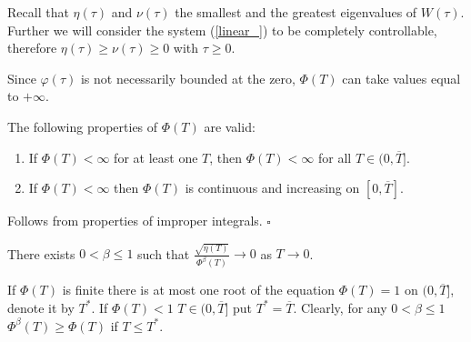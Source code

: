 \documentclass[../main.tex]{subfiles}
\begin{document}
 Recall that $\eta(\tau)$ and $\nu(\tau)$ the smallest and the greatest eigenvalues of $W(\tau)$. Further we will consider the system (\ref{linear_}) to be completely controllable, therefore $\eta(\tau) \geqslant \nu(\tau) \geqslant 0$  with $\tau \geq 0$.
 
Since $ \varphi(\tau) $ is not necessarily bounded at the zero, $\Phi(T)$ can take values equal to $+\infty$. 
\begin{lemma}%
The following properties of $\Phi(T)$ are valid:
\begin{enumerate}
 \item If $\Phi(T) < \infty $ for at least one $T$, then $\Phi(T) < \infty $ for all $T \in (0, \overline{T}]$.
\item If $\Phi(T) < \infty $ then $\Phi(T)$ is continuous and increasing on  $ [0,\overline{T}]$.
 \end{enumerate}
\end{lemma}
\doc Follows from  properties of improper integrals.
	\hfill $ \square $
\begin{assumption}\label{asm2}
There exists $ 0 < \beta \leqslant 1$ such that $\frac{\sqrt{\eta(T)}}{\Phi^\beta(T)} \to 0$ as $T \to 0$.
\end{assumption}
If $\Phi(T)$ is finite there is at most one root of the equation $\Phi(T)=1$ on $(0,\overline{T}]$,  denote it by $T^*$.  If $\Phi(T)<1$  $T\in (0,\overline{T}]$ put $T^*=\overline{T}$. Clearly, for any  $ 0 < \beta \leqslant 1$  $\Phi^\beta(T)\geqslant \Phi(T)$ if $T \leqslant T^*$.
\end{document}
